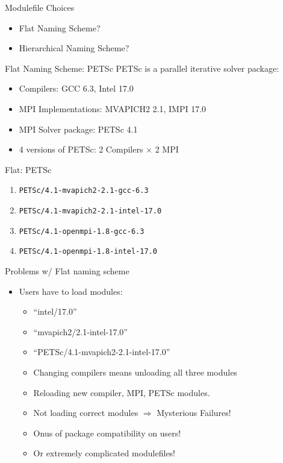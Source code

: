 \documentclass[dvipsnames,aspectratio=169]{beamer}
\begin{document}
\begin{frame}{Modulefile Choices}
  \begin{itemize}
    \item Flat Naming Scheme?
    \item Hierarchical Naming Scheme?
  \end{itemize}
\end{frame}

\begin{frame}{Flat Naming Scheme: PETSc}
  PETSc is a parallel iterative solver package:
  \begin{itemize}
    \item Compilers: GCC 6.3, Intel 17.0
    \item MPI Implementations: MVAPICH2 2.1, IMPI 17.0
    \item MPI Solver package: PETSc 4.1
    \item 4 versions of PETSc: 2 Compilers $\times$ 2 MPI
  \end{itemize}
\end{frame}

\begin{frame}{Flat: PETSc }
  \begin{enumerate}
  \item \texttt{PETSc/4.1-mvapich2-2.1-gcc-6.3}
  \item \texttt{PETSc/4.1-mvapich2-2.1-intel-17.0}
  \item \texttt{PETSc/4.1-openmpi-1.8-gcc-6.3}
  \item \texttt{PETSc/4.1-openmpi-1.8-intel-17.0}
  \end{enumerate}
\end{frame}

\begin{frame}{Problems w/ Flat naming scheme}
  \begin{itemize}
    \item Users have to load modules:
      \begin{itemize}
        \item ``intel/17.0''
        \item ``mvapich2/2.1-intel-17.0''
        \item ``PETSc/4.1-mvapich2-2.1-intel-17.0''
        \item Changing compilers means unloading all three modules
        \item Reloading new compiler, MPI, PETSc modules.
        \item Not loading correct modules $\Rightarrow$ Mysterious Failures!
        \item Onus of package compatibility on users!
        \item Or extremely complicated modulefiles!
      \end{itemize}
  \end{itemize}
\end{frame}
\end{document}
